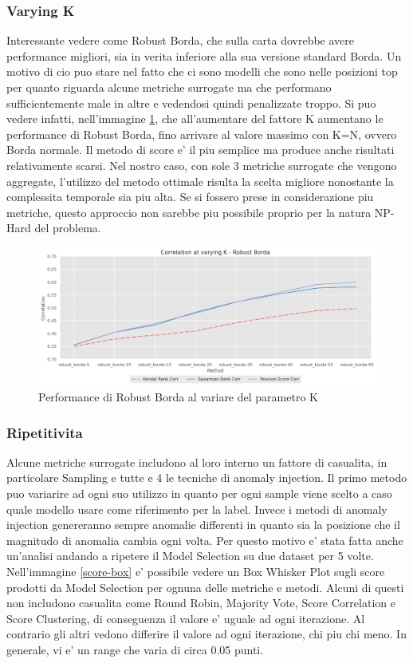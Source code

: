 \newpage
\subsubsection{Varying K}
Interessante vedere come Robust Borda, che sulla carta dovrebbe avere performance migliori, sia in verita inferiore alla sua versione standard Borda. Un motivo di cio puo stare nel fatto che ci sono modelli che sono nelle posizioni top per quanto riguarda alcune metriche surrogate ma che performano sufficientemente male in altre e vedendosi quindi penalizzate troppo.
Si puo vedere infatti, nell'immagine \ref{varying-k}, che all'aumentare del fattore K aumentano le performance di Robust Borda, fino arrivare al valore massimo con K=N, ovvero Borda normale.
Il metodo di score e' il piu semplice ma produce anche risultati relativamente scarsi. Nel nostro caso, con sole 3 metriche surrogate che vengono aggregate, l'utilizzo del metodo ottimale risulta la scelta migliore nonostante la complessita temporale sia piu alta. Se si fossero prese in considerazione piu metriche, questo approccio non sarebbe piu possibile proprio per la natura NP-Hard del problema.

\begin{figure}[t]
	\centering
	\includegraphics[width=14cm, scale=1]{images/varying-k}
	\caption{Performance di Robust Borda al variare del parametro K}
	\label{varying-k}
		
\end{figure}

\subsubsection{Ripetitivita}
Alcune metriche surrogate includono al loro interno un fattore di casualita, in particolare Sampling e tutte e 4 le tecniche di anomaly injection. Il primo metodo puo variarire ad ogni suo utilizzo in quanto per ogni sample viene scelto a caso quale modello usare come riferimento per la label. Invece i metodi di anomaly injection genereranno sempre anomalie differenti in quanto sia la posizione che il magnitudo di anomalia cambia ogni volta.
Per questo motivo e' stata fatta anche un'analisi andando a ripetere il Model Selection su due dataset per 5 volte.
Nell'immagine \ref{score-box}  e' possibile vedere un Box Whisker Plot sugli score prodotti da Model Selection per ognuna delle metriche e metodi. Alcuni di questi non includono casualita come Round Robin, Majority Vote, Score Correlation e Score Clustering, di conseguenza il valore e' uguale ad ogni iterazione. Al contrario gli altri vedono differire il valore ad ogni iterazione, chi piu chi meno. In generale, vi e' un range che varia di circa 0.05 punti.

